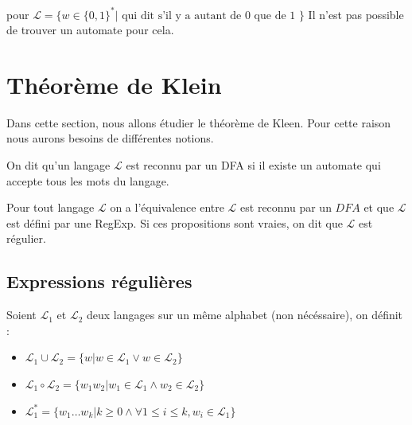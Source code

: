 \begin{centering}

\end{centering}

\begin{exemple}
    pour $\mathcal{L}= \{w\in \{0,1\}^* | \text{ qui dit s'il y a autant de 0 que de 1 }\}$
    Il n'est pas possible de trouver un automate pour cela.
\end{exemple}

\section{Théorème de Klein}

Dans cette section, nous allons étudier le théorème de Kleen. Pour cette raison nous aurons besoins de différentes notions.

\begin{definition}
On dit qu'un langage $\mathcal{L}$ est reconnu par un DFA si il existe un automate qui accepte tous les mots du langage.
\end{definition}

\begin{theoreme}
Pour tout langage $\mathcal{L}$ on a l'équivalence entre $\mathcal{L}$ est reconnu par un $DFA$ et que $\mathcal{L}$ est défini par une RegExp. Si ces propositions sont vraies, on dit que $\mathcal{L}$ est régulier.
\end{theoreme}
 
\subsection{Expressions régulières}
Soient $\mathcal{L}_1$ et $\mathcal{L}_2$ deux langages sur un même alphabet (non nécéssaire), on définit :
\begin{itemize}
    \item $\mathcal{L}_1 \cup \mathcal{L}_2 = \{w | w\in \mathcal{L}_1 \lor w\in \mathcal{L}_2\} $
    \item $\mathcal{L}_1 \circ \mathcal{L}_2 = \{w_1w_2 | w_1\in \mathcal{L}_1 \land w_2\in \mathcal{L}_2  \}$
    \item $\mathcal{L}_1^*= \{w_1\dots w_k | k \geq 0 \land \forall 1\leq i \leq k, w_i \in \mathcal{L}_1\}$
\end{itemize}

